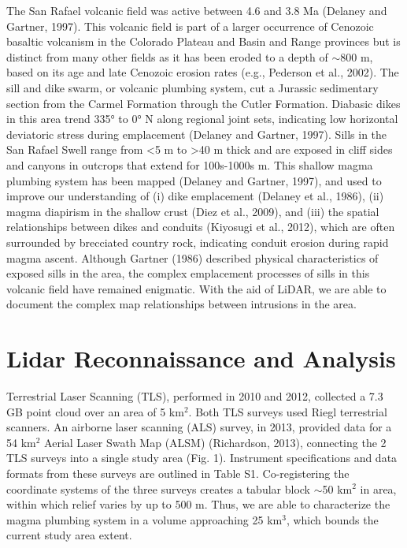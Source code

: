 \documentclass[12pt,letter]{article}
\begin{document}
The San Rafael volcanic field was active between 4.6 and 3.8 Ma (Delaney and Gartner, 1997). This volcanic field is part of a larger occurrence of Cenozoic basaltic volcanism in the Colorado Plateau and Basin and Range provinces but is distinct from many other fields as it has been eroded to a depth of $\sim$800 m, based on its age and late Cenozoic erosion rates (e.g., Pederson et al., 2002). The sill and dike swarm, or volcanic plumbing system, cut a Jurassic sedimentary section from the Carmel Formation through the Cutler Formation. Diabasic dikes in this area trend 335° to 0° N along regional joint sets, indicating low horizontal deviatoric stress during emplacement (Delaney and Gartner, 1997). Sills in the San Rafael Swell range from <5 m to >40 m thick and are exposed in cliff sides and canyons in outcrops that extend for 100s-1000s m. This shallow magma plumbing system has been mapped (Delaney and Gartner, 1997), and used to improve our understanding of (i) dike emplacement (Delaney et al., 1986), (ii) magma diapirism in the shallow crust (Diez et al., 2009), and (iii) the spatial relationships between dikes and conduits (Kiyosugi et al., 2012), which are often surrounded by brecciated country rock, indicating conduit erosion during rapid magma ascent. Although Gartner (1986) described physical characteristics of exposed sills in the area, the complex emplacement processes of sills in this volcanic field have remained enigmatic. With the aid of LiDAR, we are able to document the complex map relationships between intrusions in the area.

\section{Lidar Reconnaissance and Analysis}

Terrestrial Laser Scanning (TLS), performed in 2010 and 2012, collected a 7.3 GB point cloud over an area of 5 km$^2$. Both TLS surveys used Riegl terrestrial scanners. An airborne laser scanning (ALS) survey, in 2013, provided data for a 54 km$^2$ Aerial Laser Swath Map (ALSM) (Richardson, 2013), connecting the 2 TLS surveys into a single study area (Fig. 1). Instrument specifications and data formats from these surveys are outlined in Table S1. Co-registering the coordinate systems of the three surveys creates a tabular block $\sim$50 km$^2$ in area, within which relief varies by up to 500 m. Thus, we are able to characterize the magma plumbing system in a volume approaching 25 km$^3$, which bounds the current study area extent.
\end{document}
